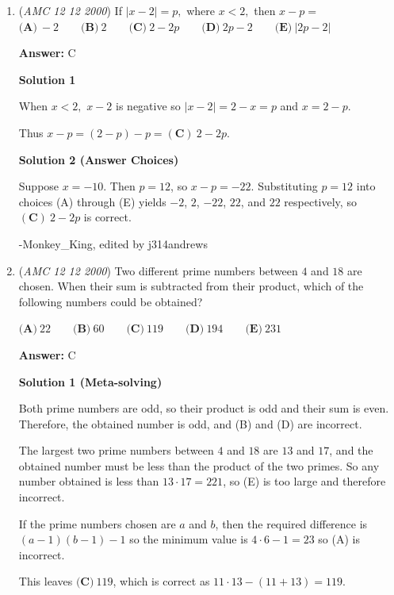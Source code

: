 \begin{enumerate}
 


	\item (\textit{AMC 12 12 2000}) If $|x - 2| = p,$ where $x < 2,$ then $x - p =$
$\textbf{(A)}\ -2 \qquad \textbf{(B)}\ 2 \qquad \textbf{(C)}\ 2-2p \qquad \textbf{(D)}\ 2p-2 \qquad \textbf{(E)}\ |2p-2|$

 \textbf{Answer: }C



\textbf{Solution 1}

When $x < 2,$ $x-2$ is negative so $|x - 2| = 2-x = p$ and $x = 2-p$.

 Thus $x-p = (2-p)-p = \boxed{\mathbf{(C)}\ \ensuremath{2-2p}}$.

 



\textbf{Solution 2 (Answer Choices)}

Suppose $x = -10$.  Then $p = 12$, so $x - p = -22$.  Substituting $p = 12$ into choices (A) through (E) yields $-2$, $2$, $-22$, $22$, and $22$ respectively, so $\boxed{\mathbf{(C)}\ \ensuremath{2-2p}}$ is correct.

 -Monkey\_King, edited by j314andrews

 


	\item (\textit{AMC 12 12 2000}) Two different prime numbers between $4$ and $18$ are chosen. When their sum is subtracted from their product, which of the following numbers could be obtained?


 $\textbf{(A)}\ 22 \qquad \textbf{(B)}\ 60 \qquad \textbf{(C)}\ 119 \qquad \textbf{(D)}\ 194 \qquad \textbf{(E)}\ 231$

 \textbf{Answer: }C



\textbf{Solution 1 (Meta-solving)}

Both prime numbers are odd, so their product is odd and their sum is even.  Therefore, the obtained number is odd, and (B) and (D) are incorrect. 

 The largest two prime numbers between $4$ and $18$ are $13$ and $17$, and the obtained number must be less than the product of the two primes.  So any number obtained is less than $13 \cdot 17 = 221$, so (E) is too large and therefore incorrect.

 If the prime numbers chosen are $a$ and $b$, then the required difference is $(a - 1)(b - 1) - 1$ so the minimum value is $4 \cdot 6 - 1 = 23$ so (A) is incorrect.

 This leaves $\boxed{\textbf{(C)}\ 119}$, which is correct as $11 \cdot 13 - (11+13) = 119$.


\end{enumerate}
